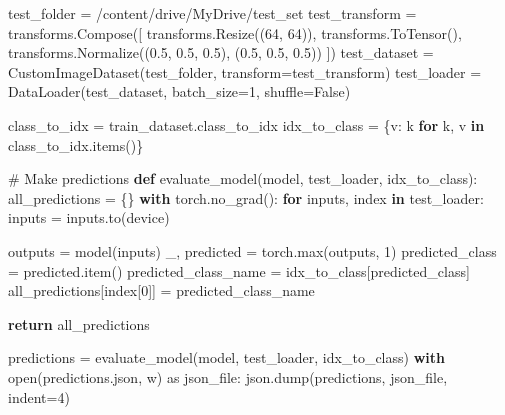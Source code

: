 \documentclass[
  letterpaper,
  DIV=11,
  numbers=noendperiod]{scrartcl}
\newenvironment{Shaded}{\begin{snugshade}}{\end{snugshade}}
\newcommand{\BuiltInTok}[1]{\textcolor[rgb]{0.00,0.23,0.31}{#1}}
\newcommand{\CommentTok}[1]{\textcolor[rgb]{0.37,0.37,0.37}{#1}}
\newcommand{\ControlFlowTok}[1]{\textcolor[rgb]{0.00,0.23,0.31}{\textbf{#1}}}
\newcommand{\DecValTok}[1]{\textcolor[rgb]{0.68,0.00,0.00}{#1}}
\newcommand{\FloatTok}[1]{\textcolor[rgb]{0.68,0.00,0.00}{#1}}
\newcommand{\ImportTok}[1]{\textcolor[rgb]{0.00,0.46,0.62}{#1}}
\newcommand{\KeywordTok}[1]{\textcolor[rgb]{0.00,0.23,0.31}{\textbf{#1}}}
\newcommand{\NormalTok}[1]{\textcolor[rgb]{0.00,0.23,0.31}{#1}}
\newcommand{\OperatorTok}[1]{\textcolor[rgb]{0.37,0.37,0.37}{#1}}
\newcommand{\StringTok}[1]{\textcolor[rgb]{0.13,0.47,0.30}{#1}}
\newcommand{\VariableTok}[1]{\textcolor[rgb]{0.07,0.07,0.07}{#1}}
\begin{document}
\begin{Shaded}
\begin{Highlighting}[]
\NormalTok{test\_folder }\OperatorTok{=} \StringTok{\textquotesingle{}/content/drive/MyDrive/test\_set\textquotesingle{}}
\NormalTok{test\_transform }\OperatorTok{=}\NormalTok{ transforms.Compose([}
\NormalTok{    transforms.Resize((}\DecValTok{64}\NormalTok{, }\DecValTok{64}\NormalTok{)),}
\NormalTok{    transforms.ToTensor(),}
\NormalTok{    transforms.Normalize((}\FloatTok{0.5}\NormalTok{, }\FloatTok{0.5}\NormalTok{, }\FloatTok{0.5}\NormalTok{), (}\FloatTok{0.5}\NormalTok{, }\FloatTok{0.5}\NormalTok{, }\FloatTok{0.5}\NormalTok{))}
\NormalTok{])}
\NormalTok{test\_dataset }\OperatorTok{=}\NormalTok{ CustomImageDataset(test\_folder, transform}\OperatorTok{=}\NormalTok{test\_transform)}
\NormalTok{test\_loader }\OperatorTok{=}\NormalTok{ DataLoader(test\_dataset, batch\_size}\OperatorTok{=}\DecValTok{1}\NormalTok{, shuffle}\OperatorTok{=}\VariableTok{False}\NormalTok{)}

\NormalTok{class\_to\_idx }\OperatorTok{=}\NormalTok{ train\_dataset.class\_to\_idx}
\NormalTok{idx\_to\_class }\OperatorTok{=}\NormalTok{ \{v: k }\ControlFlowTok{for}\NormalTok{ k, v }\KeywordTok{in}\NormalTok{ class\_to\_idx.items()\}}

\CommentTok{\# Make predictions}
\KeywordTok{def}\NormalTok{ evaluate\_model(model, test\_loader, idx\_to\_class):}
\NormalTok{    all\_predictions }\OperatorTok{=}\NormalTok{ \{\}}
    \ControlFlowTok{with}\NormalTok{ torch.no\_grad():}
        \ControlFlowTok{for}\NormalTok{ inputs, index }\KeywordTok{in}\NormalTok{ test\_loader:}
\NormalTok{            inputs }\OperatorTok{=}\NormalTok{ inputs.to(device)}

\NormalTok{            outputs }\OperatorTok{=}\NormalTok{ model(inputs)}
\NormalTok{            \_, predicted }\OperatorTok{=}\NormalTok{ torch.}\BuiltInTok{max}\NormalTok{(outputs, }\DecValTok{1}\NormalTok{)}
\NormalTok{            predicted\_class }\OperatorTok{=}\NormalTok{ predicted.item()}
\NormalTok{            predicted\_class\_name }\OperatorTok{=}\NormalTok{ idx\_to\_class[predicted\_class]}
\NormalTok{            all\_predictions[index[}\DecValTok{0}\NormalTok{]] }\OperatorTok{=}\NormalTok{ predicted\_class\_name}

    \ControlFlowTok{return}\NormalTok{ all\_predictions}

\NormalTok{predictions }\OperatorTok{=}\NormalTok{ evaluate\_model(model, test\_loader, idx\_to\_class)}
\ControlFlowTok{with} \BuiltInTok{open}\NormalTok{(}\StringTok{\textquotesingle{}predictions.json\textquotesingle{}}\NormalTok{, }\StringTok{\textquotesingle{}w\textquotesingle{}}\NormalTok{) }\ImportTok{as}\NormalTok{ json\_file:}
\NormalTok{    json.dump(predictions, json\_file, indent}\OperatorTok{=}\DecValTok{4}\NormalTok{)}


\end{Highlighting}
\end{Shaded}
\end{document}
